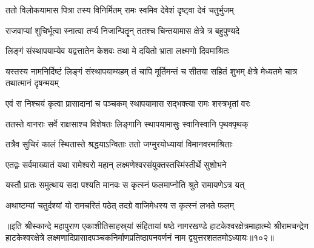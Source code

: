 \twolineshloka
{ततो विलोकयामास पित्रा तस्य विनिर्मितम्}
{रामः स्वमिव देवेशं दृष्ट्वा देवं चतुर्भुजम्}%

\twolineshloka
{राजवाप्यां शुचिर्भूत्वा स्नात्वा तर्प्य निजान्पितॄन्}
{ततश्च चिन्तयामास क्षेत्रे त्र बहुपुण्यदे}%

\twolineshloka
{लिङ्गं संस्थापयाम्येव यद्वत्तातेन केशवः}
{तथा मे दयितो भ्राता लक्ष्मणो दिवमाश्रितः}%

\threelineshloka
{यस्तस्य नामनिर्दिष्टं लिङ्गं संस्थापयाम्यहम्}
{तं चापि मूर्तिमन्तं च सीतया सहितं शुभम्}
{क्षेत्रे मेध्यतमे चात्र तथात्मानं दृषन्मयम्}%

\twolineshloka
{एवं स निश्चयं कृत्वा प्रासादानां च पञ्चकम्}
{स्थापयामास सद्भक्त्या रामः शस्त्रभृतां वरः}%

\twolineshloka
{ततस्ते वानराः सर्वे राक्षसाश्च विशेषतः}
{लिङ्गानि स्थापयामासुः स्वानिस्वानि पृथक्पृथक्}%

\twolineshloka
{तत्रैव सुचिरं कालं स्थितास्ते श्रद्धयाऽन्विताः}
{ततो जग्मुरयोध्यायां विमानवरमाश्रिताः}%

\twolineshloka
{एतद्वः सर्वमाख्यातं यथा रामेश्वरो महान्}
{लक्ष्मणेश्वरसंयुक्तस्तस्मिंस्तीर्थे सुशोभने}%

\twolineshloka
{यस्तौ प्रातः समुत्थाय सदा पश्यति मानवः}
{स कृत्स्नं फलमाप्नोति श्रुते रामायणेऽत्र यत्}%

\twolineshloka
{अथाष्टम्यां चतुर्दश्यां यो रामचरितं पठेत्}
{तदग्रे वाजिमेधस्य स कृत्स्नं लभते फलम्}%

॥इति श्रीस्कान्दे महापुराण एकाशीतिसाहस्र्यां संहितायां षष्ठे नागरखण्डे हाटकेश्वरक्षेत्रमाहात्म्ये श्रीरामचन्द्रेण हाटकेश्वरक्षेत्रे लक्ष्मणादिप्रासादपञ्चकनिर्माणप्रतिष्ठापनवर्णनं नाम द्व्युत्तरशततमोऽध्यायः॥१०२॥